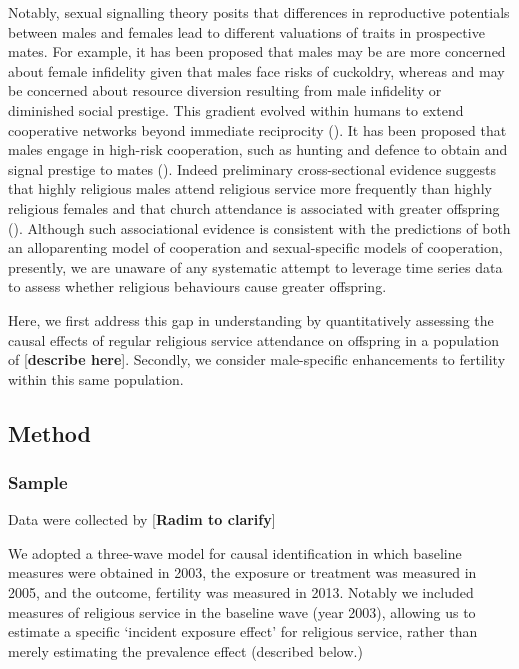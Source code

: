\documentclass[
  single column]{article}
\begin{document}
Notably, sexual signalling theory posits that differences in
reproductive potentials between males and females lead to different
valuations of traits in prospective mates. For example, it has been
proposed that males may be are more concerned about female infidelity
given that males face risks of cuckoldry, whereas and may be concerned
about resource diversion resulting from male infidelity or diminished
social prestige. This gradient evolved within humans to extend
cooperative networks beyond immediate reciprocity
(). It has been
proposed that males engage in high-risk cooperation, such as hunting and
defence to obtain and signal prestige to mates
(). Indeed preliminary
cross-sectional evidence suggests that highly religious males attend
religious service more frequently than highly religious females and that
church attendance is associated with greater offspring
(). Although such
associational evidence is consistent with the predictions of both an
alloparenting model of cooperation and sexual-specific models of
cooperation, presently, we are unaware of any systematic attempt to
leverage time series data to assess whether religious behaviours cause
greater offspring.

Here, we first address this gap in understanding by quantitatively
assessing the causal effects of regular religious service attendance on
offspring in a population of {[}\textbf{describe here}{]}. Secondly, we
consider male-specific enhancements to fertility within this same
population.

\subsection{Method}\label{method}

\subsubsection{Sample}\label{sample}

Data were collected by {[}\textbf{Radim to clarify}{]}

We adopted a three-wave model for causal identification in which
baseline measures were obtained in 2003, the exposure or treatment was
measured in 2005, and the outcome, fertility was measured in 2013.
Notably we included measures of religious service in the baseline wave
(year 2003), allowing us to estimate a specific `incident exposure
effect' for religious service, rather than merely estimating the
prevalence effect (described below.)
\end{document}
